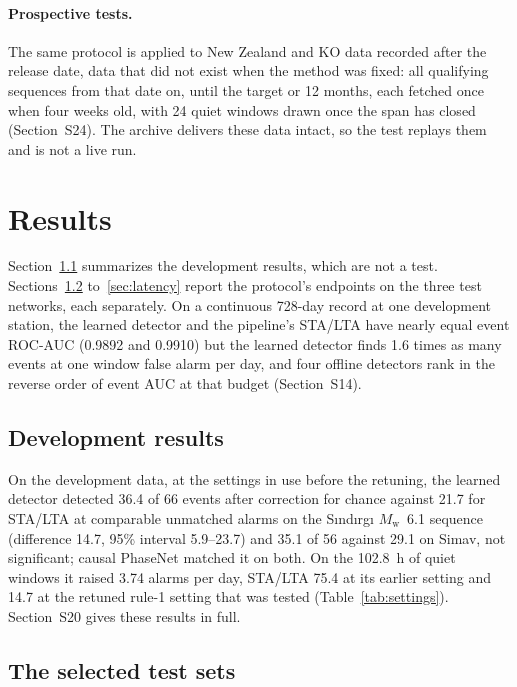 \documentclass[a4paper,fleqn]{cas-sc}
\newcommand{\Mw}{$M_\mathrm{w}$}
\newcommand{\stalta}{STA/LTA}
\begin{document}
\paragraph{Prospective tests.} The same protocol is applied to New Zealand and KO
data recorded after the release date, data that did not exist when the method was
fixed: all qualifying sequences from that date on, until the target or 12 months,
each fetched once when four weeks old, with 24 quiet windows drawn once the span has
closed (Section~S24). The archive delivers these data intact, so the test replays
them and is not a live run.

\section{Results}\label{sec:results}

Section~\ref{sec:dev-results} summarizes the development results, which are not a
test. Sections~\ref{sec:selected}
to~\ref{sec:latency} report the protocol's endpoints on the three test
networks, each separately. On a continuous 728-day record at one development station,
the learned detector and the pipeline's \stalta{} have nearly equal event ROC-AUC
(0.9892 and 0.9910) but the learned detector finds 1.6 times as many events at one
window false alarm per day, and four offline detectors rank in the reverse order of
event AUC at that budget (Section~S14).

\subsection{Development results}\label{sec:dev-results}

On the development data, at the settings in use before the retuning, the learned
detector detected 36.4 of 66 events after correction for chance against 21.7 for
\stalta{} at comparable unmatched alarms on the S\i{}nd\i{}rg\i{} \Mw{}~6.1 sequence
(difference 14.7, 95\% interval 5.9--23.7) and 35.1 of 56 against 29.1 on Simav, not
significant; causal PhaseNet matched it on both. On the 102.8~h of quiet windows it
raised 3.74 alarms per day, \stalta{} 75.4 at its earlier setting and 14.7 at the
retuned rule-1 setting that was tested (Table~\ref{tab:settings}).
Section~S20 gives these results in full.

\subsection{The selected test sets}\label{sec:selected}
\end{document}
